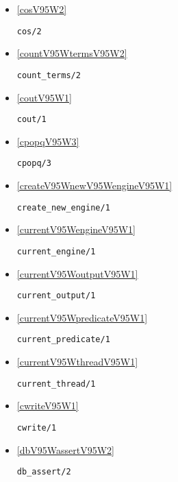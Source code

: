 \begin{itemize}
\item \ref{cosV95W2} 
\begin{verbatim}
cos/2
\end{verbatim}

\item \ref{countV95WtermsV95W2} 
\begin{verbatim}
count_terms/2
\end{verbatim}

\item \ref{coutV95W1} 
\begin{verbatim}
cout/1
\end{verbatim}

\item \ref{cpopqV95W3} 
\begin{verbatim}
cpopq/3
\end{verbatim}

\item \ref{createV95WnewV95WengineV95W1} 
\begin{verbatim}
create_new_engine/1
\end{verbatim}

\item \ref{currentV95WengineV95W1} 
\begin{verbatim}
current_engine/1
\end{verbatim}

\item \ref{currentV95WoutputV95W1} 
\begin{verbatim}
current_output/1
\end{verbatim}

\item \ref{currentV95WpredicateV95W1} 
\begin{verbatim}
current_predicate/1
\end{verbatim}

\item \ref{currentV95WthreadV95W1} 
\begin{verbatim}
current_thread/1
\end{verbatim}

\item \ref{cwriteV95W1} 
\begin{verbatim}
cwrite/1
\end{verbatim}

\item \ref{dbV95WassertV95W2} 
\begin{verbatim}
db_assert/2
\end{verbatim}


\end{itemize}

